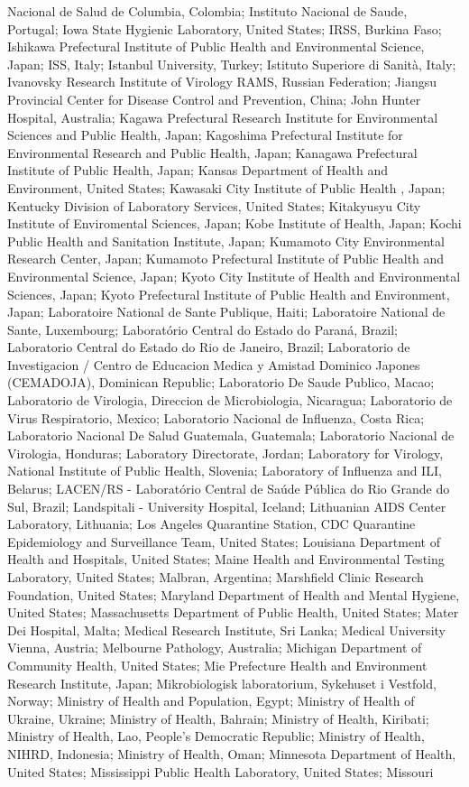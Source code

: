 \documentclass[9pt,lineno]{elife} %
\begin{document}
\begin{appendixbox}
Nacional de Salud de Columbia, Colombia; Instituto Nacional de Saude, Portugal; Iowa State Hygienic Laboratory, United States; IRSS, Burkina Faso; Ishikawa Prefectural Institute of Public Health and Environmental Science, Japan; ISS, Italy; Istanbul University, Turkey; Istituto Superiore di Sanità, Italy; Ivanovsky Research Institute of Virology RAMS, Russian Federation; Jiangsu Provincial Center for Disease Control and Prevention, China; John Hunter Hospital, Australia; Kagawa Prefectural Research Institute for Environmental Sciences and Public Health, Japan; Kagoshima Prefectural Institute for Environmental Research and Public Health, Japan; Kanagawa Prefectural Institute of Public Health, Japan; Kansas Department of Health and Environment, United States; Kawasaki City Institute of Public Health , Japan; Kentucky Division of Laboratory Services, United States; Kitakyusyu City Institute of Enviromental Sciences, Japan; Kobe Institute of Health, Japan; Kochi Public Health and Sanitation Institute, Japan; Kumamoto City Environmental Research Center, Japan; Kumamoto Prefectural Institute of Public Health and Environmental Science, Japan; Kyoto City Institute of Health and Environmental Sciences, Japan; Kyoto Prefectural Institute of Public Health and Environment, Japan; Laboratoire National de Sante Publique, Haiti; Laboratoire National de Sante, Luxembourg; Laboratório Central do Estado do Paraná, Brazil; Laboratorio Central do Estado do Rio de Janeiro, Brazil; Laboratorio de Investigacion / Centro de Educacion Medica y Amistad Dominico Japones (CEMADOJA), Dominican Republic; Laboratorio De Saude Publico, Macao; Laboratorio de Virologia, Direccion de Microbiologia, Nicaragua; Laboratorio de Virus Respiratorio, Mexico; Laboratorio Nacional de Influenza, Costa Rica; Laboratorio Nacional De Salud Guatemala, Guatemala; Laboratorio Nacional de Virologia, Honduras; Laboratory Directorate, Jordan; Laboratory for Virology, National Institute of Public Health, Slovenia; Laboratory of Influenza and ILI, Belarus; LACEN/RS - Laboratório Central de Saúde Pública do Rio Grande do Sul, Brazil; Landspitali - University Hospital, Iceland; Lithuanian AIDS Center Laboratory, Lithuania; Los Angeles Quarantine Station, CDC Quarantine Epidemiology and Surveillance Team, United States; Louisiana Department of Health and Hospitals, United States; Maine Health and Environmental Testing Laboratory, United States; Malbran, Argentina; Marshfield Clinic Research Foundation, United States; Maryland Department of Health and Mental Hygiene, United States; Massachusetts Department of Public Health, United States; Mater Dei Hospital, Malta; Medical Research Institute, Sri Lanka; Medical University Vienna, Austria; Melbourne Pathology, Australia; Michigan Department of Community Health, United States; Mie Prefecture Health and Environment Research Institute, Japan; Mikrobiologisk laboratorium, Sykehuset i Vestfold, Norway; Ministry of Health and Population, Egypt; Ministry of Health of Ukraine, Ukraine; Ministry of Health, Bahrain; Ministry of Health, Kiribati; Ministry of Health, Lao, People's Democratic Republic; Ministry of Health, NIHRD, Indonesia; Ministry of Health, Oman; Minnesota Department of Health, United States; Mississippi Public Health Laboratory, United States; Missouri 
\end{appendixbox}
\end{document}
